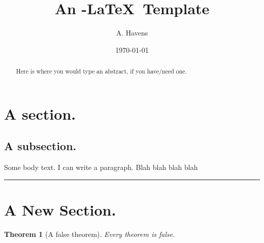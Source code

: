 \documentclass[11pt,letterpaper,pdftex]{amsart}
\title{An \AmS-\LaTeX\ Template}
\author{A. Havens}
\date{\today}
\theoremstyle{definition}
\theoremstyle{plain}
\newtheorem{thm}{Theorem}[section]
\begin{document}
\begin{abstract}
Here is where you would type an abstract, if you have/need one.
\end{abstract}
\maketitle


\section{A section.}
\subsection{A subsection.}
Some body text. I can write a paragraph. Blah blah blah blah

\bigskip %

\hrule %

\vfill %

\section{A New Section.}

\begin{thm}[A false theorem] Every theorem is false.
\end{thm}
\end{document}
